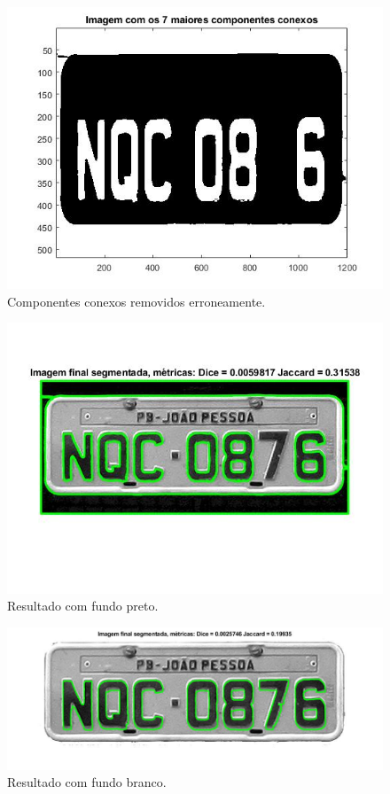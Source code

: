 \documentclass[
	12pt,				%
    oneside,			%
	a4paper,			%
	english,			%
	french,				%
	spanish,			%
	brazil,				%
	]{abntex2}
\begin{document}
\begin{figure}[!ht]
    \centering
    \includegraphics[scale=0.40]{dificuldades_experimentais/imagens_fundo_preto_2.jpg}
    \caption{Componentes conexos removidos erroneamente.}
    \label{fig:cc_fundo_preto}
\end{figure}

\begin{figure}[!ht]
    \centering
    \includegraphics[scale=0.40]{dificuldades_experimentais/pre_processamento_fundo_preto.jpg}
    \caption{Resultado com fundo preto.}
    \label{fig:resultado_fundo_preto}
\end{figure}

\begin{figure}[!ht]
    \centering
    \includegraphics[scale=0.40]{dificuldades_experimentais/pre_processamento_fundo_branco.jpg}
    \caption{Resultado com fundo branco.}
    \label{fig:resultado_fundo_branco}
\end{figure}
\end{document}
